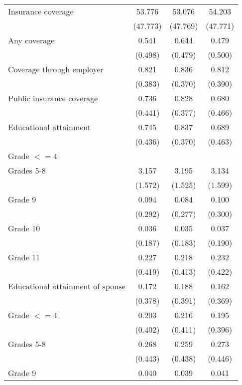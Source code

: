 \begin{tabular}{lccc}
 Insurance coverage  & 53.776 & 53.076 & 54.203 \\
 & (47.773) & (47.769) & (47.771) \\
 \hspace{0.3cm}  Any coverage  & 0.541 & 0.644 & 0.479 \\
 & (0.498) & (0.479) & (0.500) \\
 \hspace{0.3cm}  Coverage through employer  & 0.821 & 0.836 & 0.812 \\
 & (0.383) & (0.370) & (0.390) \\
 \hspace{0.3cm}  Public insurance coverage  & 0.736 & 0.828 & 0.680 \\
 & (0.441) & (0.377) & (0.466) \\
 Educational attainment  & 0.745 & 0.837 & 0.689 \\
 & (0.436) & (0.370) & (0.463) \\
 \hspace{0.3cm} Grade $<=$4  & & &  \\
 \hspace{0.3cm}  Grades 5-8  & 3.157 & 3.195 & 3.134 \\
 & (1.572) & (1.525) & (1.599) \\
 \hspace{0.3cm} Grade 9  & 0.094 & 0.084 & 0.100 \\
 & (0.292) & (0.277) & (0.300) \\
 \hspace{0.3cm} Grade 10  & 0.036 & 0.035 & 0.037 \\
 & (0.187) & (0.183) & (0.190) \\
 \hspace{0.3cm} Grade 11  & 0.227 & 0.218 & 0.232 \\
 & (0.419) & (0.413) & (0.422) \\
 Educational attainment of spouse  & 0.172 & 0.188 & 0.162 \\
 & (0.378) & (0.391) & (0.369) \\
 \hspace{0.3cm} Grade $<=$4  & 0.203 & 0.216 & 0.195 \\
 & (0.402) & (0.411) & (0.396) \\
 \hspace{0.3cm}  Grades 5-8  & 0.268 & 0.259 & 0.273 \\
 & (0.443) & (0.438) & (0.446) \\
 \hspace{0.3cm} Grade 9  & 0.040 & 0.039 & 0.041 \\

\end{tabular}
